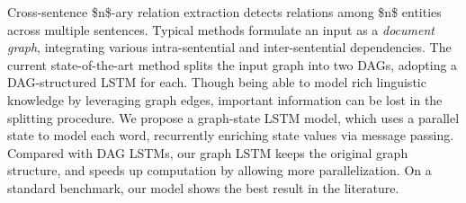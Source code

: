 Cross-sentence \$n\$-ary relation extraction detects relations among \$n\$ entities across multiple sentences. Typical methods formulate an input as a \textit{document graph}, integrating various intra-sentential and inter-sentential dependencies. The current state-of-the-art method splits the input graph into two DAGs, adopting a DAG-structured LSTM for each. Though being able to model rich linguistic knowledge by leveraging graph edges, important information can be lost in the splitting procedure. We propose a graph-state LSTM model, which uses a parallel state to model each word, recurrently enriching state values via message passing. Compared with DAG LSTMs, our graph LSTM keeps the original graph structure, and speeds up computation by allowing more parallelization. On a standard benchmark, our model shows the best result in the literature.
